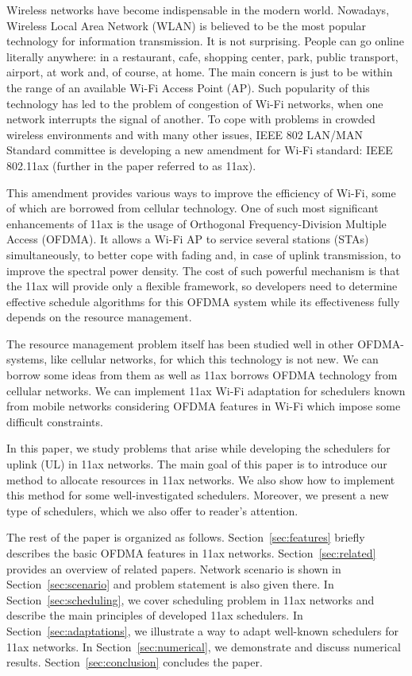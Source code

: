 Wireless networks have become indispensable in the modern world.
Nowadays, Wireless Local Area Network (WLAN) is believed to be the most popular technology for information transmission. 
It is not surprising. 
People can go online literally anywhere: in a restaurant, cafe, shopping center, park, public transport, airport, at work and, of course, at home. 
The main concern is just to be within the range of an available Wi-Fi Access Point (AP). 
Such popularity of this technology has led to the problem of congestion of Wi-Fi networks, when one network interrupts the signal of another. 
To cope with problems in crowded wireless environments and with many other issues, IEEE 802 LAN/MAN Standard committee is developing a new amendment for Wi-Fi standard: IEEE 802.11ax (further in the paper referred to as 11ax). 

This amendment provides various ways to improve the efficiency of Wi-Fi, some of which are borrowed from cellular technology.
One of such most significant enhancements of 11ax is the usa\-ge of Orthogonal Frequency-Division Multiple Access (OFDMA). 
It allows a Wi-Fi AP to service several stations (STAs) simultaneously, to better cope with fading and, in case of uplink transmission, to improve the spectral power density. 
The cost of such powerful mechanism is that the 11ax will provide only a flexible framework, so developers need to determine effective schedule algorithms for this OFDMA system while its effectiveness fully depends on the resource management. 

The resource management problem itself has been studied well in other OFDMA-systems, like cellular networks, for which this technology is not new. 
We can borrow some ideas from them as well as 11ax borrows OFDMA technology from cellular networks. 
We can implement 11ax Wi-Fi adaptation for schedulers known from mobile networks considering OFDMA features in Wi-Fi which impose some difficult constraints.  

In this paper, we study problems that arise while developing the schedulers for uplink (UL) in 11ax networks. The main goal of this paper is to introduce our method to allocate resources in 11ax networks. We also show how to implement this method for some well-investigated schedulers. 
Moreover, we present a new type of schedulers, which we also offer to reader's attention.

The rest of the paper is organized as follows.
Section~\ref{sec:features} briefly describes the basic OFDMA features in 11ax networks.
Section~\ref{sec:related} provides an overview of related papers.
Network scenario is shown in Section~\ref{sec:scenario} and problem statement is also given there.
In Section~\ref{sec:scheduling}, we cover scheduling problem in 11ax networks and describe the main principles of developed 11ax schedulers.
In Section~\ref{sec:adaptations}, we illustrate a way to adapt well-known schedulers for 11ax networks.
In Section~\ref{sec:numerical}, we demonstrate and discuss numerical results. 
Section~\ref{sec:conclusion} concludes the paper.
